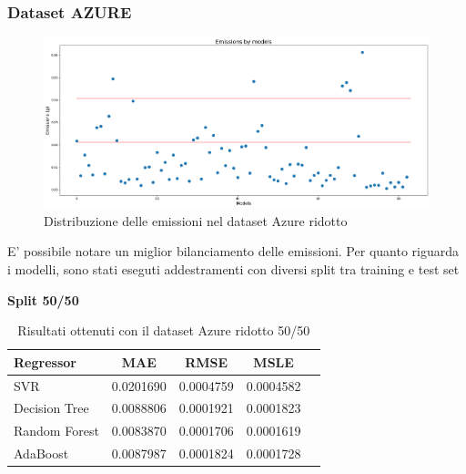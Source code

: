 \newpage

\subsubsection{Dataset AZURE}

\begin{figure}[H]
    \centering
    \includegraphics[scale=0.25]{images/nuova-situazione2-ridotto.png}
    \caption{Distribuzione delle emissioni nel dataset Azure ridotto}
\end{figure}


E’ possibile notare un miglior bilanciamento delle emissioni. Per quanto riguarda i modelli,
sono stati eseguti addestramenti con diversi split tra training e test set


\noindent\textbf{Split 50/50}


\begin{table}[H]
    \centering
    \begin{tabular}{|>{\centering\arraybackslash}m{5cm}|c|c|c|c|}
        \hline
        \textbf{Regressor} & \textbf{MAE} & \textbf{RMSE} & \textbf{MSLE} \\ [10pt]
        \hline
        SVR & 0.0201690 & 0.0004759 & 0.0004582 \\ [10pt]
        \hline
        Decision Tree & 0.0088806 & 0.0001921 & 0.0001823 \\ [10pt]
        \hline
        Random Forest & 0.0083870 & 0.0001706 & 0.0001619 \\ [10pt]
        \hline
        AdaBoost & 0.0087987 & 0.0001824 & 0.0001728 \\ [10pt]
        \hline
    \end{tabular}
    \caption{Risultati ottenuti con il dataset Azure ridotto 50/50}
    \label{tab:results}
\end{table}

